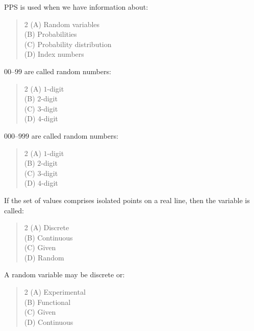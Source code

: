 \documentclass[11pt,a4paper]{article}
\begin{document}
\begin{mcqlist}
\item PPS is used when we have information about:
\begin{quote}\begin{multicols}{2}
\noindent (A) Random variables \\
(B) Probabilities \\
(C) Probability distribution \\
(D) Index numbers
\end{multicols}\end{quote}

\item $00$--$99$ are called \underline{\hspace{1.5cm}} random numbers:
\begin{quote}\begin{multicols}{2}
\noindent (A) $1$-digit \\
(B) $2$-digit \\
(C) $3$-digit \\
(D) $4$-digit
\end{multicols}\end{quote}

\item $000$--$999$ are called \underline{\hspace{1.5cm}} random numbers:
\begin{quote}\begin{multicols}{2}
\noindent (A) $1$-digit \\
(B) $2$-digit \\
(C) $3$-digit \\
(D) $4$-digit
\end{multicols}\end{quote}

\item If the set of values comprises isolated points on a real line, then the variable is called:
\begin{quote}\begin{multicols}{2}
\noindent (A) Discrete \\
(B) Continuous \\
(C) Given \\
(D) Random
\end{multicols}\end{quote}

\item A random variable may be discrete or:
\begin{quote}\begin{multicols}{2}
\noindent (A) Experimental \\
(B) Functional \\
(C) Given \\
(D) Continuous
\end{multicols}\end{quote}


\end{mcqlist}
\end{document}

